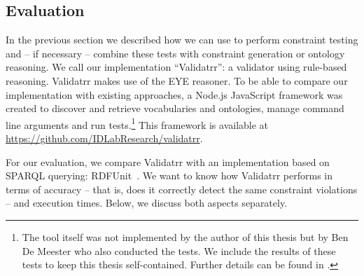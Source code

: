 \subsection{Evaluation}
In the previous section we described how we can use \nthree to perform constraint testing and -- if necessary -- combine these tests with constraint generation or ontology reasoning.
We call our implementation \enquote{Validatrr}: a validator using rule-based reasoning. Validatrr makes use of the EYE reasoner.
To be able to compare our implementation with existing approaches, a Node.js JavaScript framework was created
to discover and retrieve vocabularies and ontologies, manage command line arguments and run tests.\footnote{
The tool itself was not implemented by the author of this thesis but by Ben De Meester who also conducted the tests. We include the results 
of these tests to keep this thesis self-contained. Further details can be found in \cite{ben}.}
This framework is available at \url{https://github.com/IDLabResearch/validatrr}.

For our evaluation, we compare Validatrr with an implementation based on SPARQL querying: RDFUnit~\cite{kontokostas2014test}. 
We want to know how Validatrr performs in terms of accuracy -- that is, does it correctly detect the same constraint violations -- and execution times. Below, we discuss both aspects separately.

